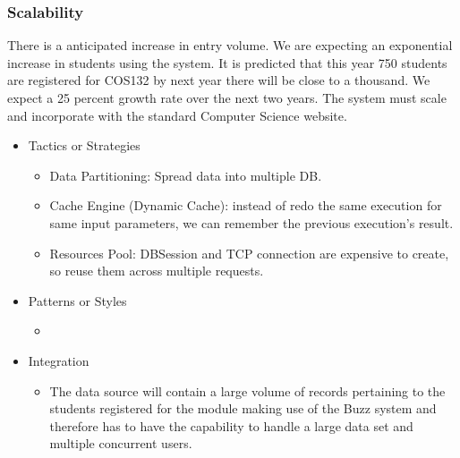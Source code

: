 
%

\subsubsection{Scalability}
		There is a anticipated increase in entry volume. We are expecting an exponential increase in students using the system. It is predicted that this year 750 students are registered for COS132 by next year there will be close to a thousand. We expect a 25 percent growth rate over the next two years. 			\cite{classRepMeeting}
		The system must scale and incorporate with the standard Computer Science website. 
		\begin{itemize}
			\item{Tactics or Strategies}
				\begin{itemize}
					\item Data Partitioning: Spread data into multiple DB.
					\item Cache Engine (Dynamic Cache): instead of redo the same execution for same input parameters, we can remember the previous execution's result.
					\item Resources Pool: DBSession and TCP connection are expensive to create, so reuse them across multiple requests.
				\end{itemize}
			\item{Patterns or Styles}
				\begin{itemize}
					\item 
				\end{itemize}
			\item{Integration}
				\begin{itemize}
					\item The data source will contain a large volume of records pertaining to the students registered for the module making use of the Buzz system and therefore has to have the capability to handle a large data set and multiple concurrent users.
				\end{itemize}
		\end{itemize}
